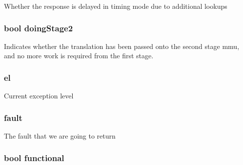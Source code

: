 \label{classArmISA_1_1TableWalker_1_1WalkerState_a08a9405038cd3486ef2ff99cdad274a0}
Whether the response is delayed in timing mode due to additional lookups \hypertarget{classArmISA_1_1TableWalker_1_1WalkerState_a8277e995719b58e8da5a0aa5bba2e623}{
\subsubsection[{doingStage2}]{\setlength{\rightskip}{0pt plus 5cm}bool {\bf doingStage2}}}
\label{classArmISA_1_1TableWalker_1_1WalkerState_a8277e995719b58e8da5a0aa5bba2e623}
Indicates whether the translation has been passed onto the second stage mmu, and no more work is required from the first stage. \hypertarget{classArmISA_1_1TableWalker_1_1WalkerState_a878510cdbf1a6438f83754acbdbf759a}{
\subsubsection[{el}]{ {\bf el}}}
\label{classArmISA_1_1TableWalker_1_1WalkerState_a878510cdbf1a6438f83754acbdbf759a}
Current exception level \hypertarget{classArmISA_1_1TableWalker_1_1WalkerState_a68714ceb74c60ea7ef5dec335bb6c5d7}{
\subsubsection[{fault}]{ {\bf fault}}}
\label{classArmISA_1_1TableWalker_1_1WalkerState_a68714ceb74c60ea7ef5dec335bb6c5d7}
The fault that we are going to return \hypertarget{classArmISA_1_1TableWalker_1_1WalkerState_a4f60754b74e2d1584c06199ae5b75f21}{
\subsubsection[{functional}]{\setlength{\rightskip}{0pt plus 5cm}bool {\bf functional}}}
